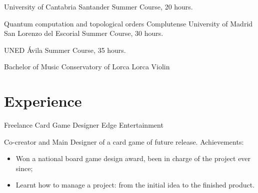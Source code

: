 \documentclass[11pt,a4paper,sans]{moderncv}
\begin{document}
{University of Cantabria}
{Santander}{}
{Summer Course, 20 hours.}

{Quantum computation and topological orders}
{Complutense University of Madrid}
{San Lorenzo del Escorial}{}
{Summer Course, 30 hours.}


{UNED}
{\'Avila}{}
{Summer Course, 35 hours.}

{Bachelor of Music}
{Conservatory of Lorca}
{Lorca}{}
{Violin}



\section{Experience}

{Freelance Card Game Designer}
{Edge Entertainment}{}{}
{Co-creator and Main Designer of a card game of future release.\newline{}%
Achievements:%
\begin{itemize}%
\item Won a national board game design award, been in charge of the project ever since;
\item Learnt how to manage a project: from the initial idea to the finished product.
\end{itemize}}
\end{document}
